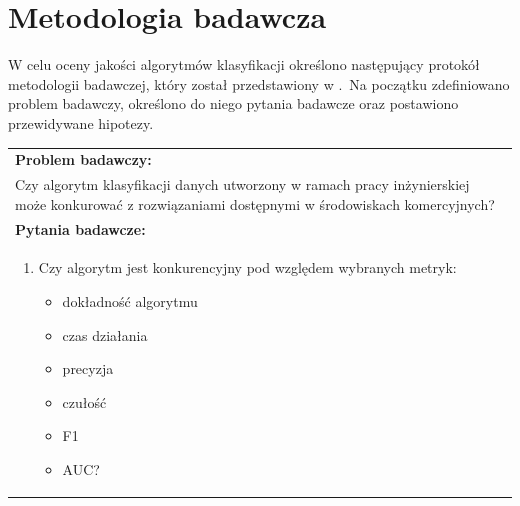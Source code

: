 \section{Metodologia badawcza}
\label{sec:met}
W celu oceny jakości algorytmów klasyfikacji określono następujący protokół metodologii badawczej, który został przedstawiony w .\ Na początku zdefiniowano problem badawczy, określono do niego pytania badawcze oraz postawiono przewidywane hipotezy.
\vfill
\pagebreak
\begin{table}[H]
    \centering
    \begin{tabular}{|L{\textwidth}|}
        \hline
        \textbf{Problem badawczy:}                                                                                                                     \\
        Czy algorytm klasyfikacji danych utworzony w ramach pracy inżynierskiej może konkurować z rozwiązaniami dostępnymi w środowiskach komercyjnych? \\ \hline

        \textbf{Pytania badawcze:}                                                                                                                     \\
        \begin{enumerate}
            \item Czy algorytm jest konkurencyjny pod względem wybranych metryk:
            \begin{itemize}
                \item dokładność algorytmu
                \item czas działania
                \item precyzja
                \item czułość
                \item F1
                \item AUC?
            \end{itemize}
        \end{enumerate}                                                                                                                                \\ \hline


\end{tabular}
\end{table}
